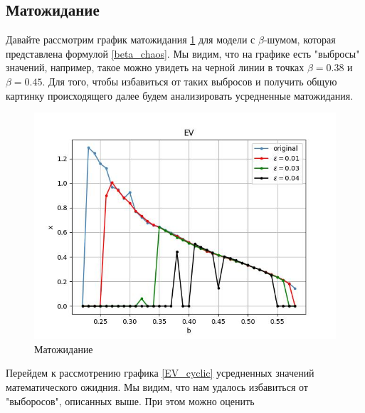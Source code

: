 \subsection{Матожидание}

    Давайте рассмотрим график матожидания \ref{EV} для модели с \(\beta\)-шумом, которая представлена формулой \ref{beta_chaos}. Мы видим, что на графике есть "выбросы" значений, например, такое можно увидеть на черной линии в точках \(\beta = 0.38\) и \(\beta = 0.45\). Для того, чтобы избавиться от таких выбросов и получить общую картинку происходящего далее будем анализировать усредненные матожидания.

        
    \begin{figure}
        \centering
        \includegraphics[width=\textwidth]{stochastic/images/EV.jpg}
        
        \captionsetup{justification=centering}
        \caption{Матожидание}
        \label{EV}
    \end{figure}

    Перейдем к рассмотрению графика \ref{EV_cyclic} усредненных значений математического ожидния. Мы видим, что нам удалось избавиться от "выборосов", описанных выше. При этом можно оценить 
        
